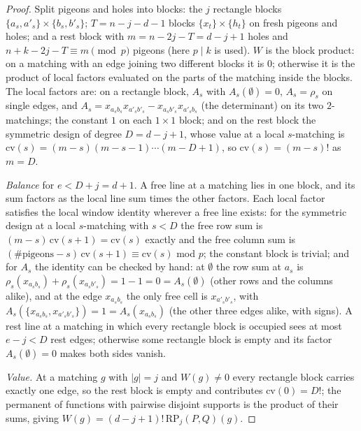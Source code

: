 \begin{proof}
Split pigeons and holes into blocks: the $j$ rectangle blocks
$\{a_s,a'_s\}\times\{b_s,b'_s\}$; $T=n-j-d-1$ blocks $\{x_t\}\times\{h_t\}$ on fresh
pigeons and holes; and a rest block with $m=n-2j-T=d-j+1$ holes and
$n+k-2j-T\equiv m\pmod p$ pigeons (here $p\mid k$ is used).
$W$ is the block product: on a matching with an edge joining two different blocks
it is $0$; otherwise it is the product of local factors evaluated on the parts of
the matching inside the blocks.  The local factors
are: on a rectangle block, $A_s$ with $A_s(\emptyset)=0$, $A_s=\rho_s$ on single
edges, and $A_s=x_{a_sb_s}x_{a'_sb'_s}-x_{a_sb'_s}x_{a'_sb_s}$ (the determinant)
on its two $2$-matchings; the constant $1$ on each $1\times1$
block; and on the rest block the symmetric design of degree $D=d-j+1$, whose value
at a local $s$-matching is $\mathrm{cv}(s)=(m-s)(m-s-1)\cdots(m-D+1)$, so
$\mathrm{cv}(s)=(m-s)!$ as $m=D$.

\emph{Balance} for $e<D+j=d+1$.
A free line at a matching lies in one block, and its sum factors as the local line
sum times the other factors.  Each local
factor satisfies the local window identity wherever a free line exists:
for the symmetric design at a local $s$-matching with $s<D$ the free row sum is
$(m-s)\,\mathrm{cv}(s+1)=\mathrm{cv}(s)$ exactly and the free column sum is
$(\#\text{pigeons}-s)\,\mathrm{cv}(s+1)\equiv\mathrm{cv}(s)$ mod
$p$; the constant
block is trivial; and for $A_s$ the
identity can be checked by hand: at $\emptyset$ the row sum at $a_s$ is
$\rho_s(x_{a_sb_s})+\rho_s(x_{a_sb'_s})=1-1=0=A_s(\emptyset)$ (other rows and the
columns alike), and at the edge $x_{a_sb_s}$ the only free cell is
$x_{a'_sb'_s}$, with $A_s(\{x_{a_sb_s},x_{a'_sb'_s}\})=1=A_s(x_{a_sb_s})$ (the other
three edges alike, with signs).
A rest line at a matching in which every rectangle block is occupied sees at most
$e-j<D$ rest edges; otherwise some rectangle block
is empty and its factor $A_s(\emptyset)=0$ makes both sides vanish.

\emph{Value.} At a matching $g$ with $|g|=j$ and $W(g)\ne0$ every rectangle block
carries exactly one edge, so the rest block is empty and contributes
$\mathrm{cv}(0)=D!$; the permanent of functions with pairwise disjoint supports is
the product of their sums, giving
$W(g)=(d-j+1)!\,\mathrm{RP}_j(P,Q)(g)$.
\end{proof}


